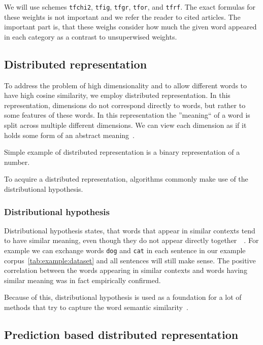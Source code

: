     We will use schemes \texttt{tfchi2}, \texttt{tfig}, \texttt{tfgr}, \texttt{tfor}, and \texttt{tfrf}.
    The exact formulas for these weights is not important and we refer the reader to cited articles.
    The important part is, that these weighs consider how much the given word appeared in each category as a contrast to unsuperwised weights. 
    
    
    \subsection{Distributed representation}
    
    To address the problem of high dimensionality and to allow different words to have high cosine similarity, we employ distributed representation.
    In this representation, dimensions do not correspond directly to words, but rather to some features of these words.
    In this representation the ''meaning`` of a word is split across multiple different dimensions.
    We can view each dimension as if it holds some form of an abstract meaning~\cite{le2014distributed}. 
    
    Simple example of distributed representation is a binary representation of a number.
    
    To acquire a distributed representation, algorithms commonly make use of the distributional hypothesis.

    \subsubsection{Distributional hypothesis}
    
    Distributional hypothesis states, that words that appear in similar contexts tend to have similar meaning,
    even though they do not appear directly together~\cite{harris1954distributional}~\cite{Rubenstein:1965:CCS:365628.365657}. %
    For example we can exchange words \texttt{dog} and \texttt{cat} in each sentence in our example corpus~\ref{tab:example:dataset}
    and all sentences will still make sense. 
    The positive correlation between the words appearing in similar contexts and words having similar meaning was in fact empirically confirmed.
    
    Because of this, distributional hypothesis is used as a foundation for a lot of methods that try to capture the word semantic similarity~\cite{rubenstein1965contextual}. 

    \subsection{Prediction based distributed representation}
    
